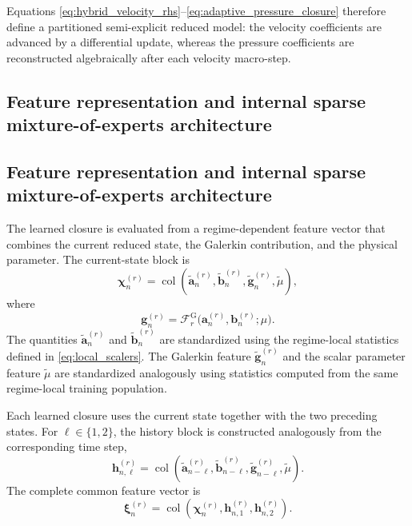 Equations \eqref{eq:hybrid_velocity_rhs}--\eqref{eq:adaptive_pressure_closure}
therefore define a partitioned semi-explicit reduced model: the velocity
coefficients are advanced by a differential update, whereas the pressure
coefficients are reconstructed algebraically after each velocity macro-step.

\subsection{Feature representation and internal sparse mixture-of-experts architecture}
\label{subsec:sparse_moe_features}
\subsection{Feature representation and internal sparse mixture-of-experts architecture}
\label{subsec:sparse_moe_features}

The learned closure is evaluated from a regime-dependent feature vector that
combines the current reduced state, the Galerkin contribution, and the
physical parameter.  The current-state block is
\begin{equation}
  \boldsymbol{\chi}^{(r)}_n
  =
  \operatorname{col}
  \left(
    \widetilde{\boldsymbol{a}}^{(r)}_n,
    \widetilde{\boldsymbol{b}}^{(r)}_n,
    \widetilde{\boldsymbol{g}}^{(r)}_n,
    \widetilde{\mu}
  \right),
  \label{eq:current_feature_block}
\end{equation}
where
\begin{equation}
  \boldsymbol{g}^{(r)}_n
  =
  \mathscr{F}^{\mathrm{G}}_r
  \bigl(
    \boldsymbol{a}^{(r)}_n,
    \boldsymbol{b}^{(r)}_n;
    \mu
  \bigr).
  \label{eq:current_galerkin_feature}
\end{equation}
The quantities $\widetilde{\boldsymbol{a}}^{(r)}_n$ and
$\widetilde{\boldsymbol{b}}^{(r)}_n$ are standardized using the
regime-local statistics defined in \eqref{eq:local_scalers}.  The Galerkin
feature $\widetilde{\boldsymbol{g}}^{(r)}_n$ and the scalar parameter
feature $\widetilde{\mu}$ are standardized analogously using statistics
computed from the same regime-local training population.

Each learned closure uses the current state together with the two preceding
states.  For $\ell\in\{1,2\}$, the history block is constructed analogously
from the corresponding time step,
\begin{equation}
  \boldsymbol{h}^{(r)}_{n,\ell}
  =
  \operatorname{col}
  \left(
    \widetilde{\boldsymbol{a}}^{(r)}_{n-\ell},
    \widetilde{\boldsymbol{b}}^{(r)}_{n-\ell},
    \widetilde{\boldsymbol{g}}^{(r)}_{n-\ell},
    \widetilde{\mu}
  \right).
  \label{eq:history_feature_block}
\end{equation}
The complete common feature vector is
\begin{equation}
  \boldsymbol{\xi}^{(r)}_n
  =
  \operatorname{col}
  \left(
    \boldsymbol{\chi}^{(r)}_n,
    \boldsymbol{h}^{(r)}_{n,1},
    \boldsymbol{h}^{(r)}_{n,2}
  \right).
  \label{eq:complete_specialist_features}
\end{equation}


